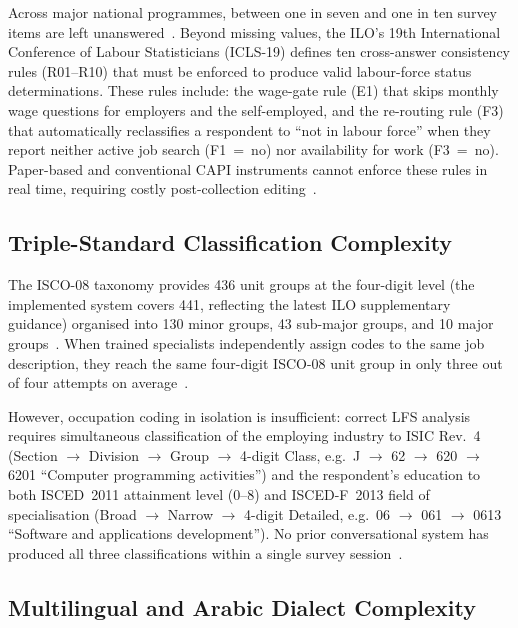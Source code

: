 Across major national programmes, between one in seven and one in ten
survey items are left unanswered~\cite{zhang2025synthetic}.
Beyond missing values, the ILO's 19th International Conference of Labour
Statisticians (ICLS-19) defines ten cross-answer consistency rules (R01--R10)
that must be enforced to produce valid labour-force status determinations.
These rules include: the wage-gate rule (E1) that skips monthly wage questions
for employers and the self-employed, and the re-routing rule (F3) that
automatically reclassifies a respondent to ``not in labour force'' when they
report neither active job search (F1~=~no) nor availability for work
(F3~=~no).
Paper-based and conventional CAPI instruments cannot enforce these rules
in real time, requiring costly post-collection editing~\cite{zhang2025synthetic}.

\subsection{Triple-Standard Classification Complexity}

The ISCO-08 taxonomy provides 436 unit groups at the four-digit level (the
implemented system covers 441, reflecting the latest ILO supplementary
guidance) organised into 130 minor groups, 43 sub-major groups, and 10 major
groups~\cite{ilo2012isco_v1,ilo2012isco_v2}.
When trained specialists independently assign codes to the same job description,
they reach the same four-digit ISCO-08 unit group in only three out of four attempts on average~\cite{hamed2025isco}.

However, occupation coding in isolation is insufficient: correct LFS analysis
requires simultaneous classification of the employing industry to ISIC Rev.~4
(Section $\rightarrow$ Division $\rightarrow$ Group $\rightarrow$ 4-digit Class,
e.g.\ J $\rightarrow$ 62 $\rightarrow$ 620 $\rightarrow$ 6201 ``Computer
programming activities'') and the respondent's education to both ISCED~2011
attainment level (0--8) and ISCED-F~2013 field of specialisation (Broad
$\rightarrow$ Narrow $\rightarrow$ 4-digit Detailed, e.g.\ 06 $\rightarrow$
061 $\rightarrow$ 0613 ``Software and applications development'').
No prior conversational system has produced all three classifications within a
single survey session~\cite{hamed2025isco}.

\subsection{Multilingual and Arabic Dialect Complexity}

